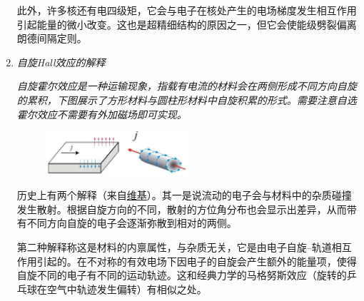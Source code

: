 \begin{enumerate}[label=\textbf{6.\Roman*}, listparindent=\parindent]
此外，许多核还有电四级矩，它会与电子在核处产生的电场梯度发生相互作用引起能量的微小改变。这也是超精细结构的原因之一，但它会使能级劈裂偏离朗德间隔定则。

\item \emph{自旋Hall效应的解释}

\emph{自旋霍尔效应是一种运输现象，指载有电流的材料会在两侧形成不同方向自旋的累积，下图展示了方形材料与圆柱形材料中自旋积累的形式。需要注意自选霍尔效应不需要有外加磁场即可实现。}
\begin{figure}[!ht]
    \centering
    \includegraphics[width=0.5\textwidth]{pic/spin-hall}
\end{figure}

历史上有两个解释（来自\href{https://en.wikipedia.org/wiki/Spin_Hall_effect}{维基}）。其一是说流动的电子会与材料中的杂质碰撞发生散射。根据自旋方向的不同，散射的方位角分布也会显示出差异，从而带有不同方向自旋的电子会逐渐弥散到相对的两侧。

第二种解释称这是材料的内禀属性，与杂质无关，它是由电子自旋--轨道相互作用引起的。在不对称的有效电场下因电子的自旋会产生额外的能量项，使得自旋不同的电子有不同的运动轨迹。这和经典力学的马格努斯效应（旋转的乒乓球在空气中轨迹发生偏转）有相似之处。

\end{enumerate}